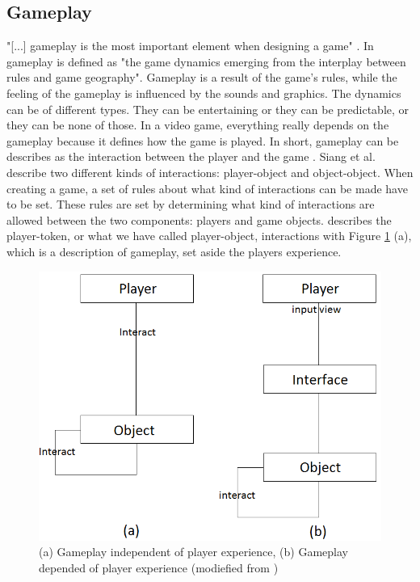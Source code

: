 \subsection{Gameplay}

"[...] gameplay is the most important element when designing a game" \cite{umlapproach}.  In \cite{understandingvg} gameplay is defined as "the game dynamics emerging from the interplay between rules and game geography". Gameplay is a result of the game's rules, while the feeling of the gameplay is influenced by the sounds and graphics. The dynamics can be of different types. They can be entertaining or they can be predictable, or they can be none of those. In a video game, everything really depends on the gameplay because it defines how the game is played. In short, gameplay can be describes as the interaction between the player and the game \cite{umlapproach}. Siang et al. describe two different kinds of interactions: player-object and object-object. When creating a game, a set of rules about what kind of interactions can be made have to be set. These rules are set by determining what kind of interactions are allowed between the two components: players and game objects. \cite{umlapproach} describes the player-token, or what we have called player-object, interactions with Figure \ref{fig:playerobject} (a), which is a description of gameplay, set aside the players experience.
\begin{figure}
\begin{center}
\includegraphics[scale=0.4]{player-object-merged}
\caption[The player-token interaction]{(a) Gameplay independent of player experience, (b) Gameplay depended of player experience (modiefied from \cite{umlapproach})}
\label{fig:playerobject}
\end{center}
\end{figure} 


